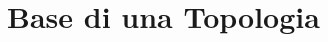 \documentclass[10pt,a4paper]{article}
\theoremstyle{definition}
\theoremstyle{plain}
\theoremstyle{remark}
\theoremstyle{remark}
\begin{document}
%
%
%
%



\section{Base di una Topologia}

\end{document}
